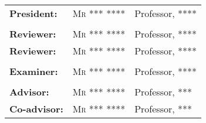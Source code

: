\begin{titlepage}
\begin{center}
 \end{center}
 \begin{center}
  \begin{tabular}{lll}
   \textbf{President:}  & \textsc{Mr *** ****} & Professor, \textsc{****}
   \tabularnewline
   \tabularnewline
   \textbf{Reviewer:}   & \textsc{Mr *** ****} & Professor, \textsc{****}
   \tabularnewline
   \textbf{Reviewer:}   & \textsc{Mr *** ****} & Professor, \textsc{****}
   \tabularnewline
   \tabularnewline
   \textbf{Examiner:}   & \textsc{Mr *** ****} & Professor, \textsc{****}
   \tabularnewline
   \tabularnewline
   \textbf{Advisor:}    & \textsc{Mr *** ****} & Professor, \textsc{***}
   \tabularnewline
   \textbf{Co-advisor:} & \textsc{Mr *** ****} & Professor, \textsc{***}
  \end{tabular}
 \end{center}
 \sloppy
\end{titlepage}
